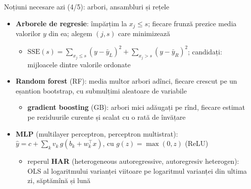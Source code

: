 \begin{frame}{Noțiuni necesare azi (4/5): arbori, ansambluri și rețele}
\itemsize{\small}
\begin{itemize}
    \item \textbf{Arborele de regresie}: împărțim la $x_j \le s$; fiecare frunză prezice media valorilor $y$ din ea; alegem $(j, s)$ care minimizează
    \begin{itemize}
        \item $\mathrm{SSE}(s) = \sum_{x_j \le s}(y - \bar y_L)^2 + \sum_{x_j > s}(y - \bar y_R)^2$; candidați: mijloacele dintre valorile ordonate
    \end{itemize}
    \item \textbf{Random forest} (RF): media multor arbori adînci, fiecare crescut pe un eșantion bootstrap, cu submulțimi aleatoare de variabile
    \begin{itemize}
        \item \textbf{gradient boosting} (GB): arbori mici adăugați pe rînd, fiecare estimat pe reziduurile curente și scalat cu o rată de învățare
    \end{itemize}
    \item \textbf{MLP} (multilayer perceptron, perceptron multistrat): $\hat y = c + \sum_k v_k\, g(b_k + w_k^\top x)$, cu $g(z) = \max(0, z)$ (ReLU)
    \begin{itemize}
        \item reperul \textbf{HAR} (heterogeneous autoregressive, autoregresiv heterogen): OLS al logaritmului varianței viitoare pe logaritmul varianței din ultima zi, săptămînă și lună
    \end{itemize}
\end{itemize}
\end{frame}

